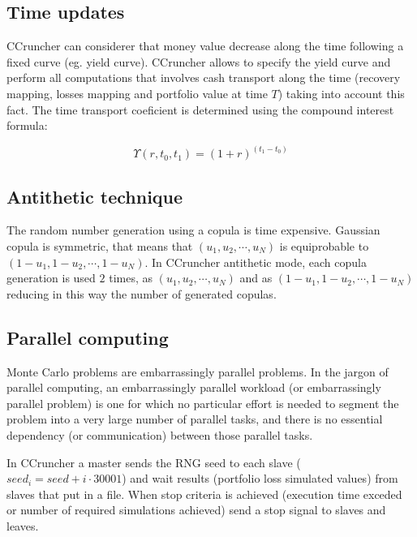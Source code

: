 \documentclass[a4paper,12pt,final]{article}
\begin{document}
\subsection{Time updates}
CCruncher can considerer that money value decrease along the time following a fixed 
curve (eg. yield curve). CCruncher allows to specify the yield curve and perform
all computations that involves cash transport along the time (recovery mapping, 
losses mapping and portfolio value at time $T$) taking into account this fact.
The time transport coeficient is determined using the compound interest formula:

\begin{displaymath}
\Upsilon(r, t_0,t_1) = (1+r)^{(t_1-t_0)}
\end{displaymath}

\subsection{Antithetic technique}
The random number generation using a copula is time expensive. Gaussian copula
is symmetric, that means that $(u_1, u_2, \cdots, u_N)$ is equiprobable to
$(1-u_1, 1-u_2, \cdots, 1-u_N)$. In CCruncher antithetic mode, each copula 
generation is used $2$ times, as $(u_1, u_2, \cdots, u_N)$ and 
as $(1-u_1, 1-u_2, \cdots, 1-u_N)$ reducing in this way the number of generated
copulas.

\subsection{Parallel computing}
Monte Carlo problems are embarrassingly parallel problems.
In the jargon of parallel computing, an embarrassingly parallel workload 
(or embarrassingly parallel problem) is one for which no particular effort 
is needed to segment the problem into a very large number of parallel tasks, 
and there is no essential dependency (or communication) between those parallel 
tasks.
\newline

In CCruncher a master sends the RNG seed to each slave 
($seed_i = seed + i \cdot 30001$) and wait results (portfolio loss simulated
values) from slaves that put in a file. When stop criteria is achieved 
(execution time exceded or number of required simulations achieved) send a 
stop signal to slaves and leaves.
\end{document}
